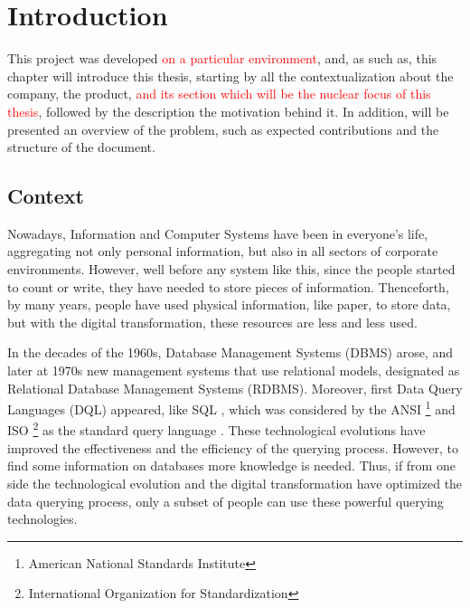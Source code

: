 \newcommand{\novathesis}{\emph{novathesis}}
\newcommand{\novathesisclass}{\texttt{novathesis.cls}}


\chapter{Introduction}
\label{cha:introduction}
This project was developed \textcolor{red}{on a particular environment}, and, as such as, this chapter will introduce this thesis, starting by all the contextualization about the company, the product, \textcolor{red}{and its section which will be the nuclear focus of this thesis}, followed by the description the motivation behind it. In addition, will be presented an overview of the problem, such as expected contributions and the structure of the document. 

\section{Context} 
\label{sec:context}
Nowadays, Information and Computer Systems have been in everyone’s life, aggregating not only personal information, but also in all sectors of corporate environments. However, well before any system like this, since the people started to count or write, they have needed to store pieces of information. \cite{historyOfDatabases} Thenceforth, by many years, people have used physical information, like paper, to store data, but with the digital transformation, these resources are less and less used.

In the decades of the 1960s, Database Management Systems (DBMS) arose, and later at 1970s new management systems that use relational models, designated as Relational Database Management Systems (RDBMS). Moreover, first Data Query Languages (DQL) appeared, like SQL \cite{sequel_aStructuredEnglishQueryLanguage}, which was considered by the ANSI \footnote{American National Standards Institute} and ISO \footnote{International Organization for Standardization} as the standard query language \cite{databaseManagementSystems}. These technological evolutions have improved the effectiveness and the efficiency of the querying process. However, to find some information on databases more knowledge is needed. Thus, if from one side the technological evolution and the digital transformation have optimized the data querying process, only a subset of people can use these powerful querying technologies.

